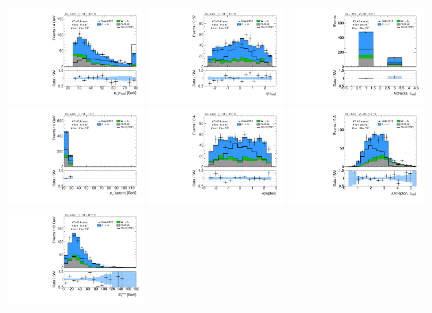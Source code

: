 \clearpage
\begin{figure}[tp]
  \centering
  \includegraphics[width=0.32\textwidth]{figures/vbf-LTT/tau-pt}
  \includegraphics[width=0.32\textwidth]{figures/vbf-LTT/tau-eta}
  \includegraphics[width=0.32\textwidth]{figures/vbf-LTT/tau-numTrack}
  \includegraphics[width=0.32\textwidth]{figures/vbf-LTT/lep-pt-hi}
  \includegraphics[width=0.32\textwidth]{figures/vbf-LTT/lep-eta}
  \includegraphics[width=0.32\textwidth]{figures/vbf-LTT/taulep-dR}
  \includegraphics[width=0.32\textwidth]{figures/vbf-LTT/met-pt-hi}

\end{figure}
